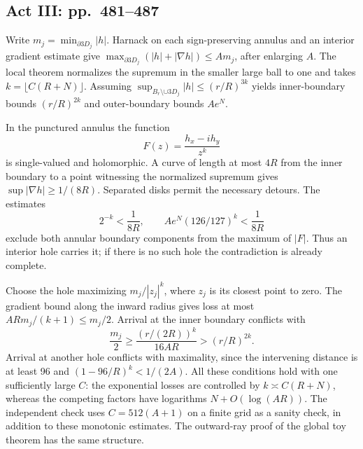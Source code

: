 \documentclass[10pt]{article}
\begin{document}
\subsection*{Act III: pp. 481–487}
Write \(m_j=\min_{\partial3D_j}|h|\). Harnack on each sign-preserving annulus and an interior gradient estimate give \(\max_{\partial3D_j}(|h|+|\nabla h|)\le A m_j\), after enlarging \(A\). The local theorem normalizes the supremum in the smaller large ball to one and takes \(k=\lfloor C(R+N)\rfloor\). Assuming \(\sup_{B_r\setminus\cup3D_j}|h|\le(r/R)^{3k}\) yields inner-boundary bounds \((r/R)^{2k}\) and outer-boundary bounds \(Ae^N\).\par
In the punctured annulus the function \[F(z)=\frac{h_x-ih_y}{z^k}\] is single-valued and holomorphic. A curve of length at most \(4R\) from the inner boundary to a point witnessing the normalized supremum gives \(\sup|\nabla h|\ge1/(8R)\). Separated disks permit the necessary detours. The estimates \[2^{-k}<\frac1{8R},\qquad
 Ae^N(126/127)^k<\frac1{8R}\] exclude both annular boundary components from the maximum of \(|F|\). Thus an interior hole carries it; if there is no such hole the contradiction is already complete.\par
Choose the hole maximizing \(m_j/|z_j|^k\), where \(z_j\) is its closest point to zero. The gradient bound along the inward radius gives loss at most \(ARm_j/(k+1)\le m_j/2\). Arrival at the inner boundary conflicts with \[\frac{m_j}{2}\ge\frac{(r/(2R))^k}{16AR}>(r/R)^{2k}.\] Arrival at another hole conflicts with maximality, since the intervening distance is at least 96 and \((1-96/R)^k<1/(2A)\). All these conditions hold with one sufficiently large \(C\): the exponential losses are controlled by \(k\asymp C(R+N)\), whereas the competing factors have logarithms \(N+O(\log(AR))\). The independent check uses \(C=512(A+1)\) on a finite grid as a sanity check, in addition to these monotonic estimates. The outward-ray proof of the global toy theorem has the same structure.\par
\end{document}
